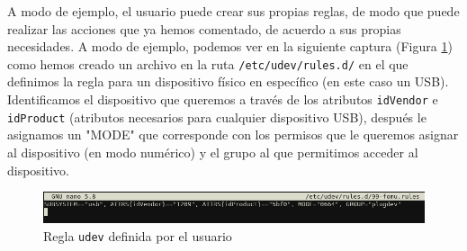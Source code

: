 \documentclass[12pt]{article}
\begin{document}
	\pagebreak
	
	\noindent A modo de ejemplo, el usuario puede crear sus propias reglas, de modo que puede realizar las acciones que ya hemos comentado, de acuerdo a sus propias necesidades. A modo de ejemplo, podemos ver en la siguiente captura (Figura \ref{img: udev rule}) como hemos creado un archivo en la ruta \texttt{/etc/udev/rules.d/} en el que definimos la regla para un dispositivo físico en específico (en este caso un USB). Identificamos el dispositivo que queremos a través de los atributos \texttt{idVendor} e \texttt{idProduct} (atributos necesarios para cualquier dispositivo USB), después le asignamos un "MODE" que corresponde con los permisos que le queremos asignar al dispositivo (en modo numérico) y el grupo al que permitimos acceder al dispositivo.\\
	
	\begin{figure}[h!]
		\begin{center}
			\includegraphics[width=1\textwidth]{img/udev_rule.png}
			\caption{Regla \texttt{udev} definida por el usuario} 
			\label{img: udev rule}
		\end{center}
	\end{figure}
	
\end{document}
